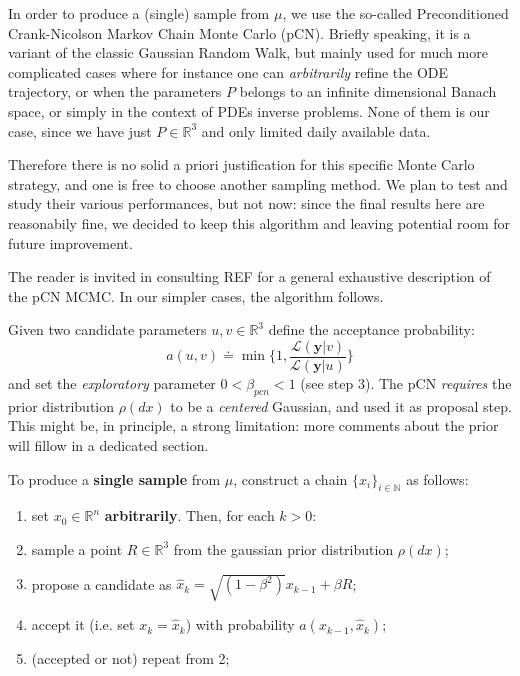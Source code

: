 \documentclass[8pt]{article}
\begin{document}
In order to produce a (single) sample from $\mu$,
we use the so-called Preconditioned
Crank-Nicolson Markov Chain Monte Carlo (pCN).
Briefly speaking, it is a variant of the classic
Gaussian Random Walk, but mainly used for much more complicated cases
where for instance one can \emph{arbitrarily} refine the ODE
trajectory, or when the parameters $P$ belongs to 
an infinite dimensional Banach space, or simply in the context of
PDEs inverse problems.
None of them is our case, since we have just $P \in \mathbb{R}^3$ and
only limited daily available data.


Therefore there is no solid a priori justification for this specific 
Monte Carlo strategy, and one is free to choose another sampling method.
We plan to test and study their various performances, but not now:
since the final results here are reasonabily fine, we decided
to keep this algorithm and leaving potential room for future improvement.


The reader is invited in consulting REF for a general exhaustive description
of the pCN MCMC. In our simpler cases, the algorithm follows.


Given two candidate parameters $u, v \in \mathbb{R}^3$
define the acceptance probability:
\begin{equation}
	a(u, v) \doteq \min \{ 1, \frac{ \mathcal{L}(\textbf{y} | v )}
				{\mathcal{L}(\textbf{y} | u)} \}
\end{equation}
and set the \emph{exploratory} parameter $0 < \beta_{pcn} < 1$
(see step 3).
The pCN \emph{requires} the prior distribution $\rho(dx)$
to be a \emph{centered} Gaussian, and used it as proposal step.
This might be, in principle, a strong limitation: more comments about the
prior will fillow in a dedicated section.


To produce a \textbf{single sample} from $\mu$, construct a chain 
$\{ x_i \} _{i \in \mathbb{N} }$ as follows:

\begin{enumerate}
	\item set $x_0 \in \mathbb{R}^n$ \textbf{arbitrarily}. Then, for each
		$k > 0$:
	\item sample a point $R \in \mathbb{R}^3$ 
		from the gaussian prior distribution $\rho(dx)$;

	\item  propose a candidate as 
		$
		\hat{x}_{k} = \sqrt{(1 - \beta^2)} x_{k-1}
			+ \beta R
		$;
	\item	accept it (i.e. set $x_{k} = \hat{x}_{k}$)
		with probability $a(x_{k-1}, \hat{x}_k)$;
	\item (accepted or not) repeat from 2;
\end{enumerate}
\end{document}
